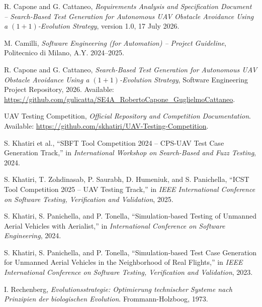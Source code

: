 \documentclass[11pt,a4paper,openany]{report}
\begin{document}
\begin{enumerate}[label={[\arabic*]},leftmargin=2.2em,itemsep=0.65em,topsep=0.4em]
\item R. Capone and G. Cattaneo, \emph{Requirements Analysis and Specification Document -- Search-Based Test Generation for Autonomous UAV Obstacle Avoidance Using a $(1+1)$-Evolution Strategy}, version 1.0, 17 July 2026.

\item M. Camilli, \emph{Software Engineering (for Automation) -- Project Guideline}, Politecnico di Milano, A.Y. 2024--2025.

\item R. Capone and G. Cattaneo, \emph{Search-Based Test Generation for Autonomous UAV Obstacle Avoidance Using a $(1+1)$-Evolution Strategy}, Software Engineering Project Repository, 2026. Available: \url{https://github.com/gulicatta/SE4A_RobertoCapone_GuglielmoCattaneo}.

\item UAV Testing Competition, \emph{Official Repository and Competition Documentation}. Available: \url{https://github.com/skhatiri/UAV-Testing-Competition}.

\item S. Khatiri et al., ``SBFT Tool Competition 2024 -- CPS-UAV Test Case Generation Track,'' in \emph{International Workshop on Search-Based and Fuzz Testing}, 2024.

\item S. Khatiri, T. Zohdinasab, P. Saurabh, D. Humeniuk, and S. Panichella, ``ICST Tool Competition 2025 -- UAV Testing Track,'' in \emph{IEEE International Conference on Software Testing, Verification and Validation}, 2025.

\item S. Khatiri, S. Panichella, and P. Tonella, ``Simulation-based Testing of Unmanned Aerial Vehicles with Aerialist,'' in \emph{International Conference on Software Engineering}, 2024.

\item S. Khatiri, S. Panichella, and P. Tonella, ``Simulation-based Test Case Generation for Unmanned Aerial Vehicles in the Neighborhood of Real Flights,'' in \emph{IEEE International Conference on Software Testing, Verification and Validation}, 2023.

\item I. Rechenberg, \emph{Evolutionsstrategie: Optimierung technischer Systeme nach Prinzipien der biologischen Evolution}. Frommann-Holzboog, 1973.
\end{enumerate}
\end{document}
